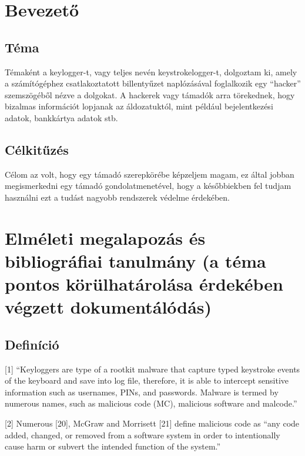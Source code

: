 \documentclass[a4paper, 11pt]{article}
\begin{document}
\renewcommand{\listfigurename}{Ábrák jegyzéke}
\listoffigures
\thispagestyle{empty}
\cleardoublepage

\renewcommand{\listtablename}{Táblázatok jegyzéke}
\listoftables
\thispagestyle{empty}
\cleardoublepage

\setcounter{page}{1}
\setlength{\parindent}{0.5cm}
\section{Bevezető}\label{sec:intro}
\subsection{Téma}
Témaként a keylogger-t, vagy teljes nevén keystrokelogger-t, dolgoztam ki, amely a számítógéphez csatlakoztatott billentyűzet naplózásával foglalkozik egy ``hacker'' szemszögéből nézve a dolgokat. A hackerek vagy támadók arra törekednek, hogy bizalmas információt lopjanak az áldozatuktól, mint például bejelentkezési adatok, bankkártya adatok stb.

\subsection{Célkitűzés}
Célom az volt, hogy egy támadó szerepkörébe képzeljem magam, ez által jobban megismerkedni egy támadó gondolatmenetével, hogy a későbbiekben fel tudjam használni ezt a tudást nagyobb rendszerek védelme érdekében.

\section{Elméleti megalapozás és bibliográfiai tanulmány (a téma pontos körülhatárolása érdekében végzett dokumentálódás)}\label{sec:bibl}

\subsection{Definíció}
[1] ``Keyloggers are type of a rootkit malware that capture typed keystroke events of the keyboard and save into log file, therefore, it is able to intercept sensitive information such as usernames, PINs, and passwords. Malware is termed by numerous names, such as malicious code (MC), malicious software and malcode.''

[2] Numerous [20], McGraw and Morrisett [21] define malicious code as ``any code added, changed, or removed from a software system in order to intentionally cause harm or subvert the intended function of the system.''
\end{document}
